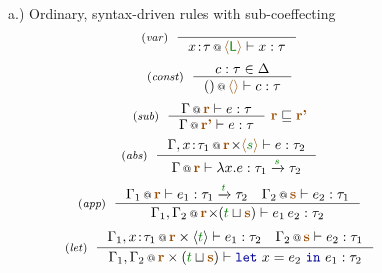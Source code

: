 \begin{figure}[t]
{\small a.) Ordinary, syntax-driven rules with sub-coeffecting}
\begin{equation*}
\tyrule{var}{}
  {\coctx{x \!:\! \tau}{\alift{\cclrd{\ident L}}} \vdash x : \tau} 
\end{equation*}
\begin{equation*}
\tyrule{const}
  {c:\tau \in \Delta}
  {\coctx{()}{\alift{}} \vdash c : \tau} 
\end{equation*}
\begin{equation*}
\tyrule{sub}
  {\coctx{\Gamma}{\aclrd{\textbf{r}}} \vdash e : \tau}
  {\coctx{\Gamma}{\aclrd{\textbf{r'}}} \vdash e : \tau}~\aclrd{\textbf{r}} \sqsubseteq \aclrd{\textbf{r'}}
\end{equation*}
\begin{equation*}
\tyrule{abs}
  {\coctx{\Gamma, x \!:\! \tau_1}{\aclrd{\textbf{r}} \cons \alift{\cclrd{s}}} \vdash e : \tau_2}
  {\coctx{\Gamma}{\aclrd{\textbf{r}}} \vdash \lambda x . e : \tau_1 \xrightarrow{\cclrd{s}} \tau_2} 
\end{equation*}
\begin{equation*}
\tyrule{app}
  { \coctx{\Gamma_1}{\aclrd{\textbf{r}}} \vdash e_1 : \tau_1 \xrightarrow{\cclrd{t}} \tau_2 \quad 
    \coctx{\Gamma_2}{\aclrd{\textbf{s}}} \vdash e_2 : \tau_1}
  { \coctx{\Gamma_1, \Gamma_2}{\aclrd{\textbf{r}} \cons (\cclrd{t} \sqcup \aclrd{\textbf{s}})} \vdash e_1 \, e_2 : \tau_2} 
\end{equation*}
\begin{equation*}
\tyrule{let}
  { \coctx{\Gamma_1, x \!:\! \tau_1}{\aclrd{\textbf{r}} \times \langle{\cclrd{t}}\rangle} \vdash e_1 : \tau_2 \quad 
    \coctx{\Gamma_2}{\aclrd{\textbf{s}}} \vdash e_2 : \tau_1}
  {\coctx{\Gamma_1, \Gamma_2}{\aclrd{\textbf{r}} \times (\cclrd{t} \sqcup \aclrd{\textbf{s}})} \vdash \kvd{let}~x=e_2~\kvd{in}~e_1 : \tau_2}
\end{equation*}
\vspace{0.5em}


\end{figure}
